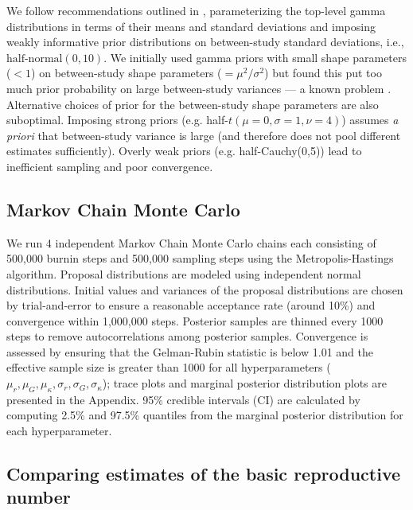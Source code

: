 \documentclass[12pt]{article}
\begin{document}
We follow recommendations outlined in \cite{gelman2006prior}, parameterizing the top-level gamma distributions in terms of their means and standard deviations and imposing weakly informative prior distributions on between-study standard deviations, i.e., $\textrm{half-normal}(0, 10)$.
We initially used gamma priors with small shape parameters ($< 1$) on between-study shape parameters ($=\mu^2/\sigma^2$) but found this put too much prior probability on large between-study variances --- a known problem \citep{gelman2006prior}.
Alternative choices of prior for the between-study shape parameters are also suboptimal. 
Imposing strong priors (e.g. half-$t(\mu=0,\sigma=1,\nu=4)$) assumes \textit{a priori} that between-study variance is large (and therefore does not pool different estimates sufficiently).
Overly weak priors (e.g. half-Cauchy(0,5)) lead to inefficient sampling and poor convergence.

\subsection{Markov Chain Monte Carlo}
\label{section:MCMC}

We run 4 independent Markov Chain Monte Carlo chains each consisting of 500,000 burnin steps and 500,000 sampling steps using the Metropolis-Hastings algorithm.
Proposal distributions are modeled using independent normal distributions.
Initial values and variances of the proposal distributions are chosen by trial-and-error to ensure a reasonable acceptance rate (around 10\%) and convergence within 1,000,000 steps.
Posterior samples are thinned every 1000 steps to remove autocorrelations among posterior samples.
Convergence is assessed by ensuring that the Gelman-Rubin statistic is below 1.01  \citep{gelman1992inference} and the effective sample size is greater than 1000 for all hyperparameters ($\mu_r, \mu_G, \mu_\kappa, \sigma_r, \sigma_G, \sigma_\kappa$);
trace plots and marginal posterior distribution plots are presented in the Appendix.
95\% credible intervals (CI) are calculated by computing 2.5\% and 97.5\% quantiles from the marginal posterior distribution for each hyperparameter.

\subsection{Comparing estimates of the basic reproductive number}
\end{document}
